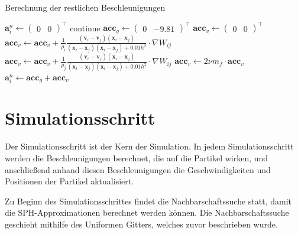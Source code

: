 \documentclass{scrreprt}
\begin{document}
\begin{algorithm}
    \caption{Berechnung der restlichen Beschleunigungen}
    \label{alg:other_accelerations}
    \begin{algorithmic}
            \State $\textbf{a}_i^n \gets \begin{pmatrix}0 & 0 \end{pmatrix}^\intercal$
            \State continue
        \EndIf
        \State $\textbf{acc}_g \gets \begin{pmatrix}0 &-9.81 \end{pmatrix}^\intercal$
        \State $\textbf{acc}_v \gets \begin{pmatrix}0 & 0 \end{pmatrix}^\intercal$
        \State
        \State {}
                \State $\textbf{acc}_v \gets \textbf{acc}_v + \frac{1}{\rho_i} \frac{(\textbf{v}_i - \textbf{v}_j)(\textbf{x}_i - \textbf{x}_j)}{(\textbf{x}_i - \textbf{x}_j)(\textbf{x}_i - \textbf{x}_j) + 0.01h^2} \cdot \nabla W_{ij}$
            \Else
                \State $\textbf{acc}_v \gets \textbf{acc}_v + \frac{1}{\rho_j} \frac{(\textbf{v}_i - \textbf{v}_j)(\textbf{x}_i - \textbf{x}_j)}{(\textbf{x}_i - \textbf{x}_j)(\textbf{x}_i - \textbf{x}_j) + 0.01h^2} \cdot \nabla W_{ij}$
            \EndIf
        \EndFor
        \State $\textbf{acc}_v \gets 2\nu m_f \cdot \textbf{acc}_v$
        \State
        \State $\textbf{a}_i^n \gets \textbf{acc}_g + \textbf{acc}_v$
    \EndFor
    \end{algorithmic}
    \end{algorithm}


\section{Simulationsschritt}
Der Simulationsschritt ist der Kern der Simulation.
In jedem Simulationsschritt werden die Beschleunigungen berechnet, die auf die Partikel wirken,
und anschließend anhand diesen Beschleunigungen die Geschwindigkeiten und Positionen der Partikel aktualisiert.

Zu Beginn des Simulationsschrittes findet die Nachbarschaftssuche statt, damit die SPH-Approximationen berechnet werden können.
Die Nachbarschaftssuche geschieht mithilfe des Uniformen Gitters, welches zuvor beschrieben wurde.
\end{document}
